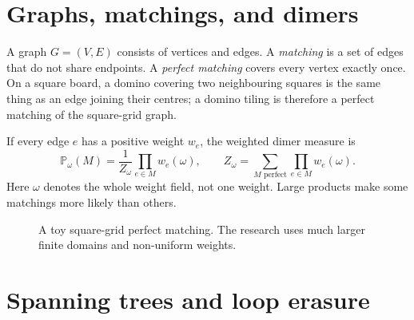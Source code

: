 \documentclass[11pt,a4paper,oneside,openany]{memoir}
\newcommand{\Prob}{\mathbb{P}}
\newcommand{\1}{\bm{1}}
\begin{document}
\section{Graphs, matchings, and dimers}

A graph $G=(V,E)$ consists of vertices and edges. A \emph{matching} is a set
of edges that do not share endpoints. A \emph{perfect matching} covers every
vertex exactly once. On a square board, a domino covering two neighbouring
squares is the same thing as an edge joining their centres; a domino tiling is
therefore a perfect matching of the square-grid graph.

If every edge $e$ has a positive weight $w_e$, the weighted dimer measure is
\[
  \Prob_\omega(M)=\frac{1}{Z_\omega}\prod_{e\in M}w_e(\omega),
  \qquad
  Z_\omega=\sum_{M\text{ perfect}}\prod_{e\in M}w_e(\omega).
\]
Here $\omega$ denotes the whole weight field, not one weight. Large products
make some matchings more likely than others.

\begin{figure}[H]
\centering
{}
\caption{A toy square-grid perfect matching. The research uses much larger finite domains and non-uniform weights.}
\end{figure}

\section{Spanning trees and loop erasure}
\end{document}

